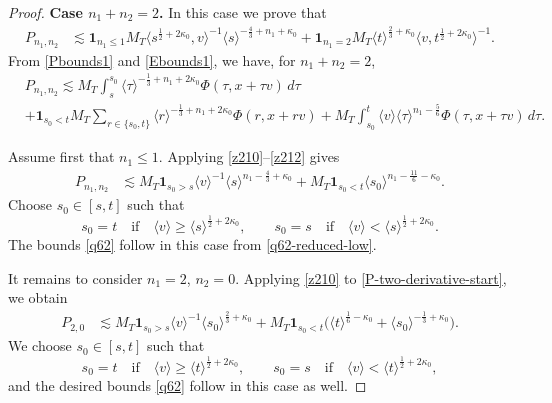 \documentclass[10pt,a4paper]{amsart}
\theoremstyle{plain}
\begin{document}
\begin{proof}
	{\bf{Case $n_1+n_2=2$.}} In this case we prove that
	\begin{align}
		P_{n_1,n_2}&\lesssim\mathbf{1}_{n_1\leq 1}M_T
		\langle s^{\frac12+2\kappa_0},v\rangle^{-1}
		\langle s\rangle^{-\frac43+n_1+\kappa_0}+\mathbf{1}_{n_1=2}M_T
		\langle t\rangle^{\frac23+\kappa_0}
		\langle v,t^{\frac12+2\kappa_0}\rangle^{-1}
		\label{q62}.
	\end{align}
	From \eqref{Pbounds1} and \eqref{Ebounds1}, we have, for $n_1+n_2=2$,
	\begin{equation}\label{P-two-derivative-start}
		\begin{split}
			&P_{n_1,n_2}\lesssim
			M_T\int_s^{s_0}
			\langle \tau\rangle^{-\frac13+n_1+2\kappa_0}\Phi(\tau,x+\tau v)\,d\tau\\
			&+\mathbf{1}_{s_0<t}M_T\sum_{r\in\{s_0,t\}}
			\langle r\rangle^{-\frac13+n_1+2\kappa_0}\Phi(r,x+rv)+M_T\int_{s_0}^{t}
			\langle v\rangle
			\langle \tau\rangle^{n_1-\frac56}
			\Phi(\tau,x+\tau v)\,d\tau.
		\end{split}	
	\end{equation}
	
	Assume first that $n_1\le1$. Applying \eqref{z210}--\eqref{z212} gives
	\begin{align}
		P_{n_1,n_2}
		&\lesssim
		M_T\mathbf 1_{s_0>s}
		\langle v\rangle^{-1}
		\langle s\rangle^{n_1-\frac43+\kappa_0}+
		M_T\mathbf 1_{s_0<t}
		\langle s_0\rangle^{n_1-\frac{11}{6}-\kappa_0}.
		\label{q62-reduced-low}
	\end{align}
	Choose $s_0\in[s,t]$ such that
	\begin{equation*}
		s_0=t
		\quad\text{if}\quad
		\langle v\rangle\ge \langle s\rangle^{\frac12+2\kappa_0},
		\qquad
		s_0=s
		\quad\text{if}\quad
		\langle v\rangle< \langle s\rangle^{\frac12+2\kappa_0}.
	\end{equation*}
	The bounds \eqref{q62} follow in this case from \eqref{q62-reduced-low}.
	
	
	It remains to consider $n_1=2$, $n_2=0$. Applying
	\eqref{z210} to \eqref{P-two-derivative-start}, we obtain
	\begin{align*}
		P_{2,0}&\lesssim M_T\mathbf 1_{s_0>s}\langle v\rangle^{-1}
		\langle s_0\rangle^{\frac23+\kappa_0}+M_T\mathbf 1_{s_0<t}
		\big(\langle t\rangle^{\frac16-\kappa_0}+\langle s_0\rangle^{-\frac13+\kappa_0}\big).
	\end{align*}
	We choose $s_0\in[s,t]$ such that
	\[
	s_0=t
	\quad\text{if}\quad
	\langle v\rangle\geq
	\langle t\rangle^{\frac12+2\kappa_0},
	\qquad
	s_0=s
	\quad\text{if}\quad
	\langle v\rangle<
	\langle t\rangle^{\frac12+2\kappa_0},
	\]
	and the desired bounds \eqref{q62} follow in this case as well.
	

\end{proof}
\end{document}
